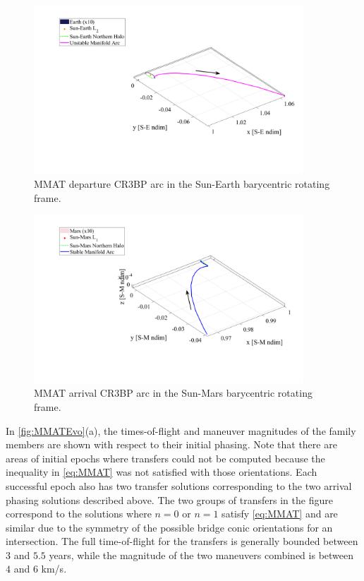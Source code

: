 \begin{figure}[ht]
    \centering
    \includegraphics[width=0.9\textwidth]{figures/MinDvSE.pdf}
    \caption{MMAT departure CR3BP arc in the Sun-Earth barycentric rotating frame.}
    \label{fig:MMATSE}
\end{figure}

\begin{figure}[ht]
    \centering
    \includegraphics[width=0.9\textwidth]{figures/MinDvSM.pdf}
    \caption{MMAT arrival CR3BP arc in the Sun-Mars barycentric rotating frame.}
    \label{fig:MMATSM}
\end{figure}

In \cref{fig:MMATEvo}(a), the times-of-flight and maneuver magnitudes of the family members are
shown with respect to their initial phasing. Note that there are areas of initial epochs where
transfers could not be computed because the inequality in \cref{eq:MMAT} was not satisfied with
those orientations. Each successful epoch also has two transfer solutions corresponding to the two
arrival phasing solutions described above. The two groups of transfers in the figure correspond to 
the solutions where $n=0$ or $n=1$ satisfy \cref{eq:MMAT} and are similar due to the symmetry of
the possible bridge conic orientations for an intersection. The full time-of-flight for the
transfers is generally bounded between $3$ and $5.5$ years, while the magnitude of the two
maneuvers combined is between $4$ and $6$ km/s.

